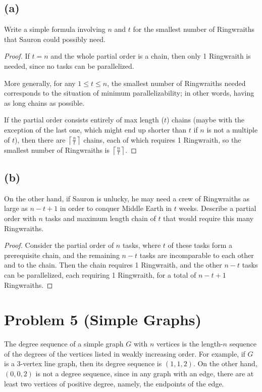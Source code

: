 \documentclass[14pt]{extarticle}
\begin{document}
\subsection{(a)} 
Write a simple formula involving $n$ and $t$ for the smallest number of Ringwraiths that Sauron could possibly need.
\begin{proof}
If $t = n$ and the whole partial order is a chain, then only 1 Ringwraith is needed, since no tasks can be parallelized.

More generally, for any $1 \leq t \leq n$, the smallest number of Ringwraiths needed corresponds to the situation of minimum parallelizability; in other words, having as long chains as possible.

If the partial order consists entirely of max length ($t$) chains (maybe with the exception of the last one, which might end up shorter than $t$ if $n$ is not a multiple of $t$), then there are $\displaystyle\left\lceil \frac{n}{t} \right\rceil$ chains, each of which requires 1 Ringwraith, so the smallest number of Ringwraiths is $\displaystyle\left\lceil \frac{n}{t} \right\rceil$.
\end{proof}

\subsection{(b)} On the other hand, if Sauron is unlucky, he may need a crew of Ringwraiths as large as $n - t + 1$ in order to conquer Middle Earth in $t$ weeks. Describe a partial order with $n$ tasks and maximum length chain of $t$ that would require this many Ringwraiths.
\begin{proof}
Consider the partial order of $n$ tasks, where $t$ of these tasks form a prerequisite chain, and the remaining $n-t$ tasks are incomparable to each other and to the chain. Then the chain requires 1 Ringwraith, and the other $n-t$ tasks can be parallelized, each requiring 1 Ringwraith, for a total of $n-t+1$ Ringwraiths.
\end{proof}

\section{Problem 5 (Simple Graphs)}
The degree sequence of a simple graph $G$ with $n$ vertices is the length-$n$ sequence of the degrees of the vertices listed in weakly increasing order. For example, if $G$ is a 3-vertex line graph, then its degree sequence is $(1,1,2)$. On the other hand, $(0,0,2)$ is not a degree sequence, since in any graph with an edge, there are at
least two vertices of positive degree, namely, the endpoints of the edge.
\end{document}
